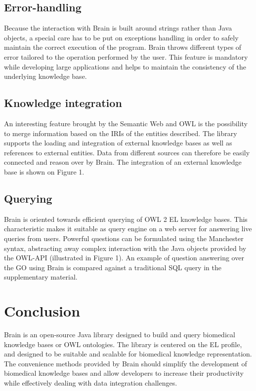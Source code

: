 \documentclass{bioinfo}
\begin{document}
\subsection{Error-handling}
Because the interaction with Brain is built around strings rather than Java objects, a special care has to be put on
exceptions handling in order to safely maintain the correct execution of the program. Brain throws different types of error tailored 
to the operation performed by the user. This feature is mandatory while developing large applications and helps to maintain the consistency
 of the underlying knowledge base.
\subsection{Knowledge integration}
An interesting feature brought by the Semantic Web and OWL is the possibility to merge information based
on the IRIs of the entities described. The library supports the loading and integration of external knowledge bases as well as 
references to external entities. Data from different sources can therefore be easily connected and reason over by Brain. The integration
of an external knowledge base is shown on Figure 1.
\subsection{Querying}
Brain is oriented towards efficient querying of OWL 2 EL knowledge bases.
This characteristic makes it suitable as query engine on a web server for
answering live queries from users.
Powerful questions can be formulated using the Manchester syntax, abstracting
away complex interaction with the Java objects provided by the OWL-API (illustrated in Figure 1).
An example of question answering over the GO using Brain
is compared against a traditional SQL query in the supplementary material.

\section{Conclusion}
Brain is an open-source Java library designed to build and query biomedical knowledge bases or OWL ontologies.
The library is centered on the EL profile, and designed to be suitable and scalable for biomedical knowledge representation.
The convenience methods provided by Brain should simplify the development of biomedical knowledge bases and allow developers
to increase their productivity while effectively dealing with data integration challenges.
\end{document}
